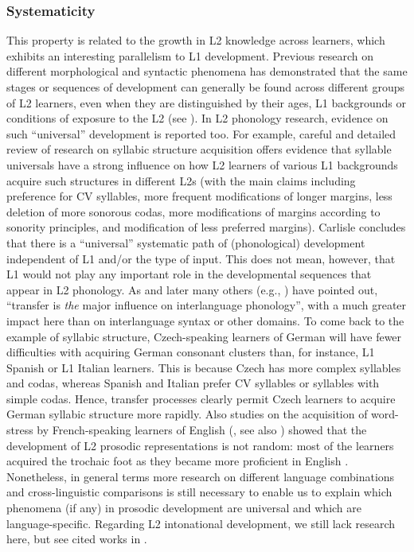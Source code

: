 \subsubsection{Systematicity}
\begin{sloppypar}
This property is related to the growth in L2 knowledge across learners, which exhibits an interesting parallelism to L1 development. Previous research on different morphological and syntactic phenomena has demonstrated that the same stages or sequences of development can generally be found across different groups of L2 learners, even when they are distinguished by their ages, L1 backgrounds or conditions of exposure to the L2 (see \citealt[11--12]{TowellHawkins1994}). In L2 phonology research, evidence on such “universal” development is reported too. For example,  careful and detailed review of research on syllabic structure acquisition offers evidence that syllable universals have a strong influence on how L2 learners of various L1 backgrounds acquire such structures in different L2s (with the main claims including preference for CV syllables, more frequent modifications of longer margins, less deletion of more sonorous codas, more modifications of margins according to sonority principles, and modification of less preferred margins). Carlisle concludes that there is a “universal” systematic path of (phonological) development independent of L1 and/or the type of input. This does not mean, however, that L1 would not play any important role in the developmental sequences that appear in L2 phonology. As \citet[13]{Ioup1984} and later many others (e.g., \citealt{Shen1990, Wennerstrom1994}) have pointed out, “transfer is \textit{the} major influence on interlanguage phonology”, with a much greater impact here than on interlanguage syntax or other domains. To come back to the example of syllabic structure, Czech-speaking learners of German will have fewer difficulties with acquiring German consonant clusters than, for instance, L1 Spanish or L1 Italian learners. This is because Czech has more complex syllables and codas, whereas Spanish and Italian prefer CV syllables or syllables with simple codas. Hence, transfer processes clearly permit Czech learners to acquire German syllabic structure more rapidly. Also studies on the acquisition of word-stress by French-speaking learners of English (\citealt{Tremblay2008a,Tremblay2008b}, see also \citealt{TremblayOwens2010}) showed that the development of L2 prosodic representations is not random: most of the learners acquired the trochaic foot as they became more proficient in English \citep[168]{Tremblay2008a}. Nonetheless, in general terms more research on different language combinations and cross-linguistic comparisons is still necessary to enable us to explain which phenomena (if any) in prosodic development are universal and which are language-specific. Regarding L2 intonational development, we still lack research here, but see cited works in .
\end{sloppypar}



